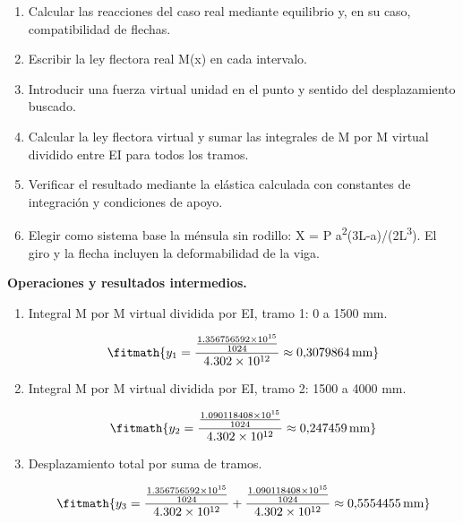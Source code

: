 \begin{enumerate}

\item Calcular las reacciones del caso real mediante equilibrio y, en su caso, compatibilidad de flechas.

\item Escribir la ley flectora real M(x) en cada intervalo.

\item Introducir una fuerza virtual unidad en el punto y sentido del desplazamiento buscado.

\item Calcular la ley flectora virtual y sumar las integrales de M por M virtual dividido entre EI para todos los tramos.

\item Verificar el resultado mediante la elástica calculada con constantes de integración y condiciones de apoyo.

\item Elegir como sistema base la ménsula sin rodillo: X = P a\textsuperscript{2}(3L-a)/(2L\textsuperscript{3}). El giro y la flecha incluyen la deformabilidad de la viga.

\end{enumerate}

\noindent\textbf{Operaciones y resultados intermedios.}

\begin{enumerate}

\item Integral M por M virtual dividida por EI, tramo 1: 0 a 1500 mm.

\[\fitmath{y_{1}=\frac{\frac{1.356756592\times10^{15}}{1024}}{4.302\times10^{12}}\approx 0{,}3079864\,\mathrm{mm}}\]

\item Integral M por M virtual dividida por EI, tramo 2: 1500 a 4000 mm.

\[\fitmath{y_{2}=\frac{\frac{1.090118408\times10^{15}}{1024}}{4.302\times10^{12}}\approx 0{,}247459\,\mathrm{mm}}\]

\item Desplazamiento total por suma de tramos.

\[\fitmath{y_{3}=\frac{\frac{1.356756592\times10^{15}}{1024}}{4.302\times10^{12}}+\frac{\frac{1.090118408\times10^{15}}{1024}}{4.302\times10^{12}}\approx 0{,}5554455\,\mathrm{mm}}\]

\end{enumerate}
